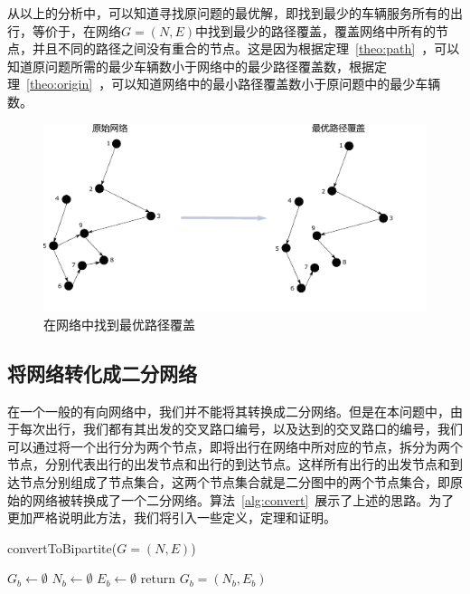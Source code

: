 \par
从以上的分析中，可以知道寻找原问题的最优解，即找到最少的车辆服务所有的出行，等价于，在网络$G = (N,E)$中找到最少的路径覆盖，覆盖网络中所有的节点，并且不同的路径之间没有重合的节点。这是因为根据定理~\ref{theo:path}~，可以知道原问题所需的最少车辆数小于网络中的最少路径覆盖数，根据定理~\ref{theo:origin}~，可以知道网络中的最小路径覆盖数小于原问题中的最少车辆数。
\begin{figure}
\centering
\includegraphics[width = 15cm]{./figures/img/pathcover.pdf}
\caption{在网络中找到最优路径覆盖}
\end{figure}

\subsection{将网络转化成二分网络}
在一个一般的有向网络中，我们并不能将其转换成二分网络。但是在本问题中，由于每次出行，我们都有其出发的交叉路口编号，以及达到的交叉路口的编号，我们可以通过将一个出行分为两个节点，即将出行在网络中所对应的节点，拆分为两个节点，分别代表出行的出发节点和出行的到达节点。这样所有出行的出发节点和到达节点分别组成了节点集合，这两个节点集合就是二分图中的两个节点集合，即原始的网络被转换成了一个二分网络。算法~\ref{alg:convert}~展示了上述的思路。为了更加严格说明此方法，我们将引入一些定义，定理和证明。

\begin{algorithm}[htbp]
\SetAlgoLined
{}
\caption{convertToBipartite($G = (N,E)$)}
\label{alg:convert}
\BlankLine
$G_b \leftarrow \emptyset$\;
$N_b \leftarrow \emptyset$\;
$E_b \leftarrow \emptyset$\;
return $G_b = (N_b, E_b)$\;
\end{algorithm}

